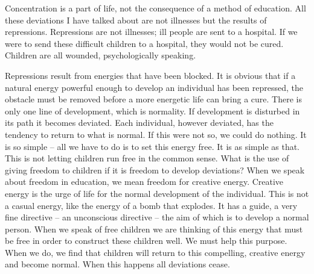 \documentclass[lang=cn,10pt]{elegantbook}
\begin{document}
Concentration is a part of life, not the consequence of a method of
education. All these deviations I have talked about are not illnesses
but the results of repressions. Repressions are not illnesses; ill
people are sent to a hospital. If we were to send these difficult
children to a hospital, they would not be cured. Children are all
wounded, psychologically speaking.

Repressions result from energies that have been blocked. It is
obvious that if a natural energy powerful enough to develop an
individual has been repressed, the obstacle must be removed before
a more energetic life can bring a cure. There is only one line of
development, which is normality. If development is disturbed in its
path it becomes deviated. Each individual, however deviated, has
the tendency to return to what is normal. If this were not so, we could
do nothing. It is so simple – all we have to do is to set this energy
free. It is as simple as that. This is not letting children run free in the
common sense. What is the use of giving freedom to children if it is
freedom to develop deviations? When we speak about freedom in
education, we mean freedom for creative energy. Creative energy is
the urge of life for the normal development of the individual. This is
not a casual energy, like the energy of a bomb that explodes. It has a
guide, a very fine directive – an unconscious directive – the aim of
which is to develop a normal person. When we speak of free children
we are thinking of this energy that must be free in order to construct
these children well. We must help this purpose. When we do, we find
that children will return to this compelling, creative energy and
become normal. When this happens all deviations cease.
\end{document}
